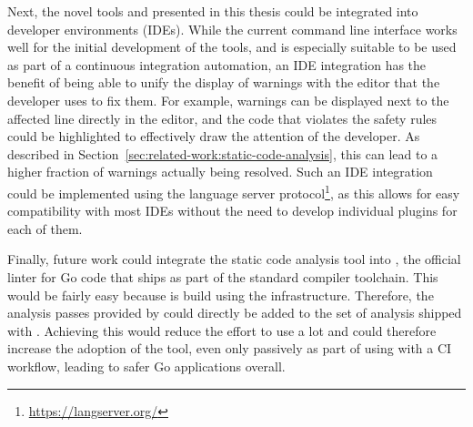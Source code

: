Next, the novel tools \toolGeiger{} and \toolSafer{} presented in this thesis could be integrated into developer
environments (\acrshort{IDE}s).
While the current command line interface works well for the initial development of the tools, and is especially suitable
to be used as part of a continuous integration automation, an \acrshort{IDE} integration has the benefit of being able
to unify the display of warnings with the editor that the developer uses to fix them.
For example, \toolSafer{} warnings can be displayed next to the affected line directly in the editor, and the code that
violates the safety rules could be highlighted to effectively draw the attention of the developer.
As described in Section~\ref{sec:related-work:static-code-analysis}, this can lead to a higher fraction of warnings
actually being resolved.
Such an \acrshort{IDE} integration could be implemented using the language server
protocol\footnote{\url{https://langserver.org/}}, as this allows for easy compatibility with most \acrshort{IDE}s
without the need to develop individual plugins for each of them.

Finally, future work could integrate the static code analysis tool \toolSafer{} into \toolVet{}, the official linter
for Go code that ships as part of the standard compiler toolchain.
This would be fairly easy because \toolSafer{} is build using the \toolVet{} infrastructure.
Therefore, the analysis passes provided by \toolSafer{} could directly be added to the set of analysis shipped with
\toolVet{}.
Achieving this would reduce the effort to use \toolSafer{} a lot and could therefore increase the adoption of the tool,
even only passively as part of using \toolVet{} with a \acrshort{CI} workflow, leading to safer Go applications overall.
